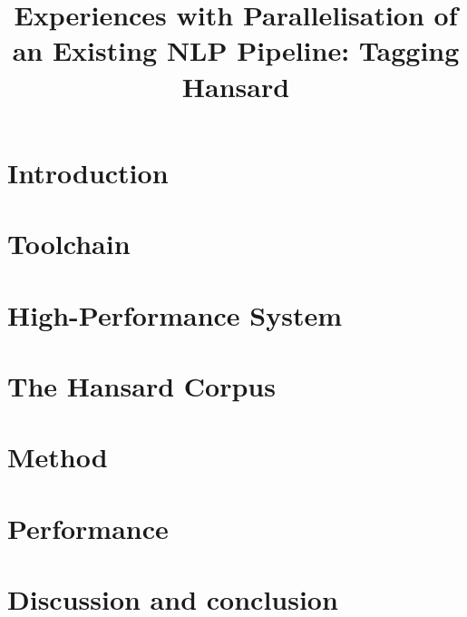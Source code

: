 \documentclass[10pt, a4paper]{article}
\title{Experiences with Parallelisation of an Existing NLP Pipeline: Tagging Hansard}
\begin{document}
\maketitleabstract%

\section{Introduction}


\section{Toolchain}



\section{High-Performance System}



\section{The Hansard Corpus}



\section{Method}



\section{Performance}




\section{Discussion and conclusion}







\end{document}
